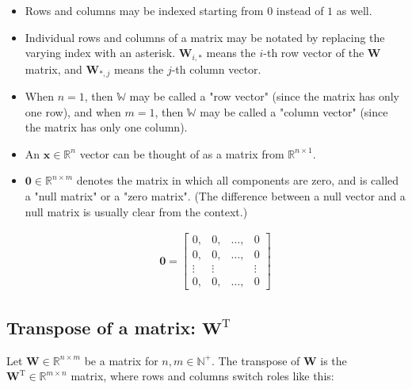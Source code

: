 \documentclass[titlepage]{article}
\begin{document}
        \begin{itemize}
          \item Rows and columns may be indexed starting from $0$ instead of $1$
                as well.

          \item Individual rows and columns of a matrix may be notated by
                replacing the varying index with an asterisk. $\mathbf{W}_{i,*}$
                means the $i$-th row vector of the $\mathbf{W}$ matrix, and
                $\mathbf{W}_{*,j}$ means the $j$-th column vector.

          \item When $n = 1$, then $\mathbb{W}$ may be called a "row vector"
                (since the matrix has only one row), and when $m = 1$, then
                $\mathbb{W}$ may be called a "column vector" (since the matrix
                has only one column).

          \item An $\mathbf{x} \in \mathbb{R}^n$ vector can be thought of as a
                matrix from $\mathbb{R}^{n \times 1}$.

          \item $\mathbf{0} \in \mathbb{R}^{n \times m}$ denotes the matrix in
                which all components are zero, and is called a "null matrix" or
                a "zero matrix". (The difference between a null vector and a
                null matrix is usually clear from the context.)

                \begin{align*}
                  \mathbf{0}
                    = \begin{bmatrix}
                        0, & 0, & \ldots, & 0 \\
                        0, & 0, & \ldots, & 0 \\
                        \vdots & \vdots & & \vdots \\
                        0, & 0, & \ldots, & 0
                      \end{bmatrix}
                \end{align*}
        \end{itemize}

      \subsection{Transpose of a matrix: $\mathbf{W}^\mathrm{T}$}

        Let $\mathbf{W} \in \mathbb{R}^{n \times m}$ be a matrix for
        $n, m \in \mathbb{N}^+$. The transpose of $\mathbf{W}$ is the
        $\mathbf{W}^\mathrm{T} \in \mathbb{R}^{m \times n}$ matrix, where
        rows and columns switch roles like this:
\end{document}
